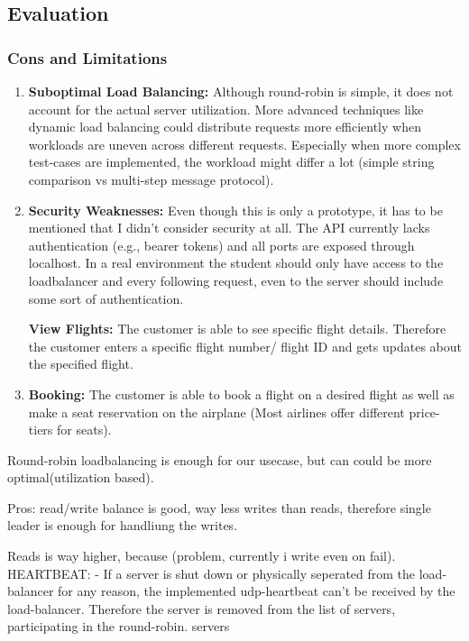 \documentclass{article}
\begin{document}
\newpage

\subsection{Evaluation}
\subsubsection{Cons and Limitations}
\begin{enumerate}

\item \textbf{Suboptimal Load Balancing:}
Although round-robin is simple, it does not account for the actual server utilization. More advanced techniques like dynamic load balancing could distribute requests more efficiently when workloads are uneven across different requests. Especially when more complex test-cases are implemented, the workload might differ a lot (simple string comparison vs multi-step message protocol).

\item \textbf{Security Weaknesses:}
Even though this is only a prototype, it has to be mentioned that I didn't consider security at all.
The API currently lacks authentication (e.g., bearer tokens) and all ports are exposed through localhost. In a real environment the student should only have access to the loadbalancer and every following request, even to the server should include some sort of authentication.




\textbf{View Flights:}
The customer is able to see specific flight details. 
Therefore the customer enters a specific flight number/ flight ID and gets updates about the specified flight.
\item \textbf{Booking:}
The customer is able to book a flight on a desired flight as well as make a seat reservation on the airplane (Most airlines offer different price-tiers for seats). 
\end{enumerate}



Round-robin loadbalancing is enough for our usecase, but can could be more optimal(utilization based).

Pros:
read/write balance is good, way less writes than reads, therefore single leader is enough for handliung the writes.

Reads is way higher, because (problem, currently i write even on fail). 
HEARTBEAT:
- If a server is shut down or physically seperated from the load-balancer for any reason, the implemented udp-heartbeat can't be received by the load-balancer. Therefore the server is removed from the list of servers, participating in the round-robin.
servers
\end{document}

